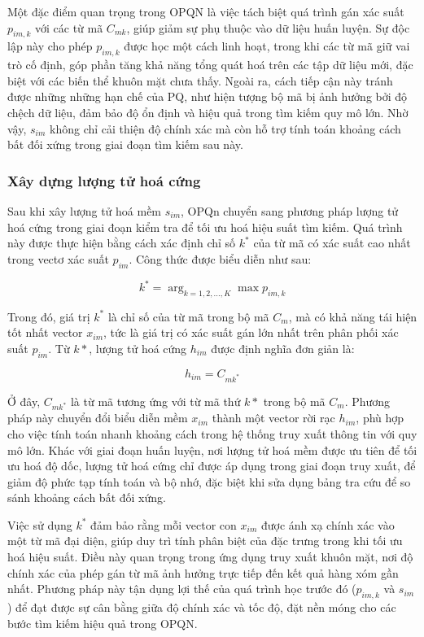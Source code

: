 Một đặc điểm quan trọng trong OPQN là việc tách biệt quá trình gán xác suất $p_{im,k}$ với các từ mã $C_{mk}$, giúp giảm sự phụ thuộc vào dữ liệu huấn luyện. Sự độc lập này cho phép $p_{im,k}$ được học một cách linh hoạt, trong khi các từ mã giữ vai trò cố định, góp phần tăng khả năng tổng quát hoá trên các tập dữ liệu mới, đặc biệt với các biến thể khuôn mặt chưa thấy. Ngoài ra, cách tiếp cận này tránh được những  những hạn chế của PQ, như hiện tượng bộ mã bị ảnh hưởng bởi độ chệch dữ liệu, đảm bảo độ ổn định và hiệu quả trong tìm kiếm quy mô lớn. Nhờ vậy, $ s_{im} $ không chỉ cải thiện độ chính xác mà còn hỗ trợ tính toán khoảng cách bất đối xứng trong giai đoạn tìm kiếm sau này.

\subsubsection{Xây dựng lượng tử hoá cứng}
Sau khi xây lượng tử hoá mềm $s_{im}$, OPQn chuyển sang phương pháp lượng tử hoá cứng trong giai đoạn kiểm tra để tối ưu hoá hiệu suất tìm kiếm. Quá trình này được thực hiện bằng cách xác định chỉ số $k^*$ của từ mã có xác suất cao nhất trong vectơ xác suất $p_{im}$. Công thức được biểu diễn như sau:

\begin{equation}
k^* = \arg _{k = 1,2,...,K}\max p_{im,k}
\end{equation}

Trong đó, giá trị $k^*$ là chỉ số của từ mã trong bộ mã $C_m$, mà có khả năng tái hiện tốt nhất vector $x_{im}$, tức là giá trị có xác suất gán lớn nhất trên phân phối xác suất $p_{im}$. Từ $k*$, lượng tử hoá cứng $h_{im}$ được định nghĩa đơn giản là:

\begin{equation}
h_{im} = C_{mk^*}
\end{equation}

Ở đây, $C_{mk^*}$ là từ mã tương ứng với từ mã thứ $k*$ trong bộ mã $C_m$. Phương pháp này chuyển đổi biểu diễn mềm $x_{im}$ thành một vector rời rạc $h_{im}$, phù hợp cho việc tính toán nhanh khoảng cách trong hệ thống truy xuất thông tin với quy mô lớn. Khác với giai đoạn huấn luyện, nơi lượng tử hoá mềm được ưu tiên để tối ưu hoá độ dốc, lượng tử hoá cứng chỉ được áp dụng trong giai đoạn truy xuất, để giảm độ phức tạp tính toán và bộ nhớ, đặc biệt khi sửa dụng bảng tra cứu để so sánh khoảng cách bất đối xứng. 

Việc sử dụng $k^*$ đảm bảo rằng mỗi vector con $x_{im}$ được ánh xạ chính xác vào một từ mã đại diện, giúp duy trì tính phân biệt của đặc trưng trong khi tối ưu hoá hiệu suất. Điều này quan trọng trong ứng dụng truy xuất khuôn mặt, nơi độ chính xác của phép gán từ mã ảnh hưởng trực tiếp đến kết quả hàng xóm gần nhất. Phương pháp này tận dụng lợi thế của quá trình học trước đó ($p_{im,k}$ và $s_{im}$) để đạt được sự cân bằng giữa độ chính xác và tốc độ, đặt nền móng cho các bước tìm kiếm hiệu quả trong OPQN.

